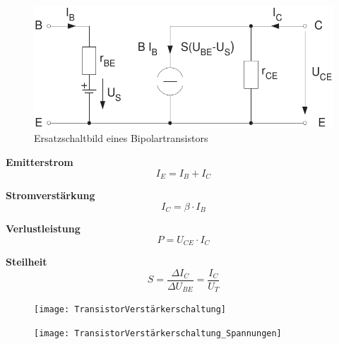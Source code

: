 \documentclass[a5paper, 12pt]{scrartcl}
\begin{document}
\begin{figure}[H]
  \centering
  \includegraphics[width=.6\textwidth]{ESBTransistor}
  \caption{Ersatzschaltbild eines Bipolartransistors}
\end{figure}

\textbf{Emitterstrom}
\[I_E = I_B + I_C\]

\textbf{Stromverstärkung}
\[I_C = \beta \cdot I_B\]

\textbf{Verlustleistung}
\[P = U_{CE} \cdot I_C\]

\textbf{Steilheit}
\[S = \frac{\Delta I_C}{\Delta U_{BE}} = \frac{I_C}{U_T}\]

\begin{figure}[H]
  \centering
  \texttt{[image: TransistorVerstärkerschaltung]}
\end{figure}

\begin{figure}[H]
  \centering
  \texttt{[image: TransistorVerstärkerschaltung\_Spannungen]}
\end{figure}
\end{document}
